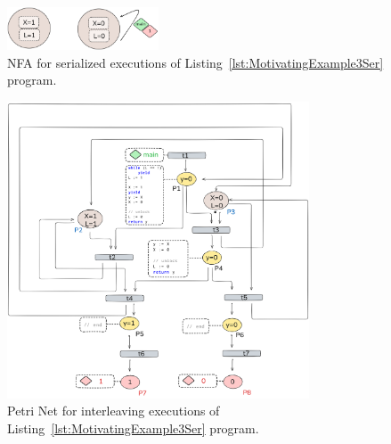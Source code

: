 \begin{figure}[htbp]
	\centering
	\includegraphics[width=0.4\textwidth]{plots/code_3_NFA.png}
	\caption{NFA for serialized executions of Listing~\ref{lst:MotivatingExample3Ser} program.}
	\label{fig:code3ExampleNFA}
\end{figure}



\begin{figure}[H]
	\centering
	\includegraphics[width=0.8\textwidth]{plots/code_3_PN_with_annotation.png}
	\caption{Petri Net for interleaving executions of Listing~\ref{lst:MotivatingExample3Ser} program.}
	\label{fig:code3ExamplePN}
\end{figure}

\newpage